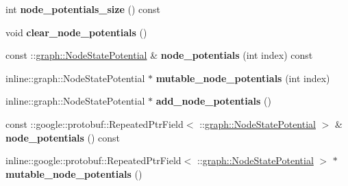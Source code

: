 \begin{DoxyCompactItemize}
\item 
\hypertarget{classgraph_1_1MRFNode_aed75e0bf0b6fa5b3ae987510ad1dd75e}{
int {\bfseries node\_\-potentials\_\-size} () const }
\label{classgraph_1_1MRFNode_aed75e0bf0b6fa5b3ae987510ad1dd75e}

\item 
\hypertarget{classgraph_1_1MRFNode_a96a52fa9efd3aa762312bfe27ca05927}{
void {\bfseries clear\_\-node\_\-potentials} ()}
\label{classgraph_1_1MRFNode_a96a52fa9efd3aa762312bfe27ca05927}

\item 
\hypertarget{classgraph_1_1MRFNode_a0d51d9a14d08b0044d5bfa9c3d2464b4}{
const ::\hyperlink{classgraph_1_1NodeStatePotential}{graph::NodeStatePotential} \& {\bfseries node\_\-potentials} (int index) const }
\label{classgraph_1_1MRFNode_a0d51d9a14d08b0044d5bfa9c3d2464b4}

\item 
\hypertarget{classgraph_1_1MRFNode_a2592e6dc49b23b2c0cc790cf42921502}{
inline::graph::NodeStatePotential $\ast$ {\bfseries mutable\_\-node\_\-potentials} (int index)}
\label{classgraph_1_1MRFNode_a2592e6dc49b23b2c0cc790cf42921502}

\item 
\hypertarget{classgraph_1_1MRFNode_a942b7f41cd43c7a85fc8bfc6a3bb9714}{
inline::graph::NodeStatePotential $\ast$ {\bfseries add\_\-node\_\-potentials} ()}
\label{classgraph_1_1MRFNode_a942b7f41cd43c7a85fc8bfc6a3bb9714}

\item 
\hypertarget{classgraph_1_1MRFNode_af5c8f3c616fe0bb78485adb1e5482a52}{
const ::google::protobuf::RepeatedPtrField$<$ ::\hyperlink{classgraph_1_1NodeStatePotential}{graph::NodeStatePotential} $>$ \& {\bfseries node\_\-potentials} () const }
\label{classgraph_1_1MRFNode_af5c8f3c616fe0bb78485adb1e5482a52}

\item 
\hypertarget{classgraph_1_1MRFNode_af9736f5670f2b2f12a56501f1dd47446}{
inline::google::protobuf::RepeatedPtrField$<$ ::\hyperlink{classgraph_1_1NodeStatePotential}{graph::NodeStatePotential} $>$ $\ast$ {\bfseries mutable\_\-node\_\-potentials} ()}
\label{classgraph_1_1MRFNode_af9736f5670f2b2f12a56501f1dd47446}

\end{DoxyCompactItemize}
